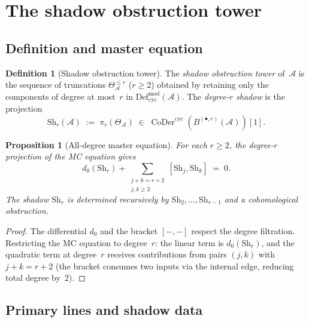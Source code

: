 \documentclass[11pt,reqno]{amsart}
\newtheorem{proposition}[theorem]{Proposition}
\theoremstyle{definition}
\newtheorem{definition}[theorem]{Definition}
\theoremstyle{remark}
\newcommand{\cA}{\mathcal{A}}
\newcommand{\Defcyc}{\mathrm{Def}_{\mathrm{cyc}}}
\newcommand{\Sh}{\mathrm{Sh}}
\numberwithin{equation}{section}
\begin{document}

\section{The shadow obstruction tower}\label{sec:tower}

\subsection{Definition and master
equation}\label{subsec:tower-def}

\begin{definition}[Shadow obstruction
tower]\label{def:shadow-tower}
The \emph{shadow obstruction tower} of~$\cA$ is the sequence
of truncations $\Theta_\cA^{\le r}$ ($r \ge 2$) obtained by
retaining only the components of degree at most~$r$ in
$\Defcyc^{\mathrm{mod}}(\cA)$.
The \emph{degree-$r$ shadow} is the projection
\[
 \Sh_r(\cA)
 \;:=\;
 \pi_r(\Theta_\cA)
 \;\in\;
 \operatorname{CoDer}^{\mathrm{cyc}}(B^{(\bullet,r)}
 (\cA))[1].
\]
\end{definition}

\begin{proposition}[All-degree master
equation]\label{prop:master-eq}
For each $r \ge 2$, the degree-$r$ projection of the
MC equation gives
\begin{equation}\label{eq:master-eq}
 d_0(\Sh_r) + \sum_{\substack{j+k = r+2 \\ j,k \ge 2}}
 [\Sh_j, \Sh_k] \;=\; 0.
\end{equation}
The shadow $\Sh_r$ is determined recursively by
$\Sh_2, \ldots, \Sh_{r-1}$ and a cohomological obstruction.
\end{proposition}

\begin{proof}
The differential $d_0$ and the bracket $[-,-]$ respect the
degree filtration. Restricting the MC equation to degree~$r$:
the linear term is $d_0(\Sh_r)$, and the quadratic term at
degree~$r$ receives contributions from pairs $(j,k)$ with
$j + k = r + 2$ (the bracket consumes two inputs via the
internal edge, reducing total degree by~$2$).
\end{proof}

\subsection{Primary lines and shadow
data}\label{subsec:primary-lines}
\end{document}
